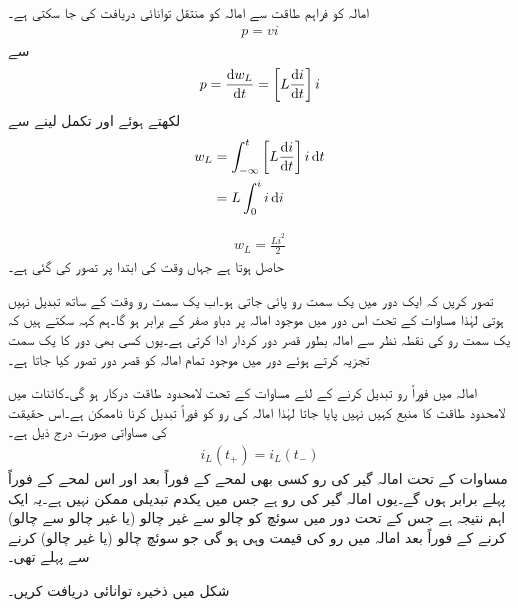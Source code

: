 امالہ کو فراہم طاقت سے امالہ کو منتقل توانائی  دریافت کی جا سکتی ہے۔
\begin{align}
p=vi
\end{align}
سے
\begin{align}\label{مساوات_امالہ_کو_مہیا_طاقت_الف}
p=\frac{\dif w_L}{\dif t}=\left[L \frac{\dif i}{\dif t}\right] i
\end{align}
لکھتے ہوئے اور تکمل لینے سے
\begin{align*}
w_L&=\int_{-\infty}^{t} \left[L\frac{\dif i}{\dif t}\right]i\dif t\\
&=L\int_{0}^{i} i \dif i
\end{align*}

\begin{align}
w_L=\frac{Li^2}{2}
\end{align}
حاصل ہوتا ہے جہاں وقت کی ابتدا  پر  تصور کی گئی ہے۔

تصور کریں کہ ایک دور میں یک سمت رو پائی جاتی ہو۔اب یک سمت رو وقت کے ساتھ تبدیل نہیں ہوتی لہٰذا مساوات  کے تحت اس دور میں موجود امالہ پر دباو صفر کے برابر ہو گا۔ہم کہہ سکتے ہیں کہ یک سمت رو کی نقطہ نظر سے امالہ بطور قصر دور کردار ادا کرتی ہے۔یوں کسی بھی دور کا یک سمت تجزیہ کرتے ہوئے دور میں موجود تمام امالہ کو قصر دور تصور کیا جاتا ہے۔

امالہ میں فوراً رو تبدیل کرنے کے لئے مساوات  کے تحت  لامحدود طاقت درکار ہو گی۔کائنات میں لامحدود طاقت کا منبع کہیں نہیں پایا جاتا لہٰذا امالہ کی رو کو فوراً تبدیل کرنا ناممکن ہے۔اس حقیقت کی مساواتی صورت درج ذیل ہے۔
\begin{align}\label{مساوات_امالہ_امالہ_گیر_رو_بلا_جوڑ_ہے}
i_L(t_+)=i_L(t_-)
\end{align}
مساوات  کے تحت امالہ گیر کی رو کسی بھی لمحے  کے فوراً بعد  اور اس لمحے کے فوراً  پہلے  برابر ہوں گے۔یوں امالہ گیر کی رو  ہے جس میں  یکدم تبدیلی ممکن نہیں ہے۔یہ ایک اہم نتیجہ ہے جس کے تحت دور میں سوئچ کو چالو سے غیر چالو (یا غیر چالو سے چالو) کرنے کے فوراً بعد امالہ میں رو کی قیمت وہی ہو گی جو سوئچ چالو (یا غیر چالو) کرنے سے پہلے تھی۔

شکل  میں ذخیرہ توانائی دریافت کریں۔

